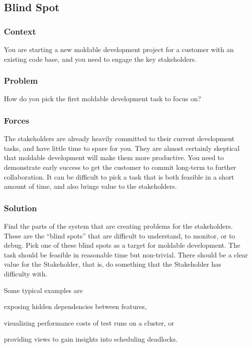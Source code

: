 \documentclass[sigconf]{acmart}
\begin{document}
\subsection*{Blind Spot}\label{pat:blindSpot}
\subsubsection*{Context}
You are starting a new moldable development project for a customer with an existing code base, and you need to engage the key stakeholders.

\subsubsection*{Problem}
How do you pick the first moldable development task to focus on?

\subsubsection*{Forces}
The stakeholders are already heavily committed to their current development tasks, and have little time to spare for you.
They are almost certainly skeptical that moldable development will make them more productive.
You need to demonstrate early success to get the customer to commit long-term to further collaboration.
It can be difficult to pick a task that is both feasible in a short amount of time, and also brings value to the stakeholders.

\subsubsection*{Solution}
Find the parts of the system that are creating problems for the stakeholders.
These are the ``blind spots'' that are difficult to understand, to monitor, or to debug.
Pick one of these blind spots as a target for moldable development.
The task should be feasible in reasonable time but non-trivial.
There should be a clear value for the Stakeholder, that is, do something that the Stakeholder has difficulty with.

Some typical examples are 
\begin{inparaenum}[(i)]
\item exposing hidden dependencies between features, 
\item visualizing performance costs of test runs on a cluster, or
\item providing views to gain insights into scheduling deadlocks.
\end{inparaenum}
\end{document}
